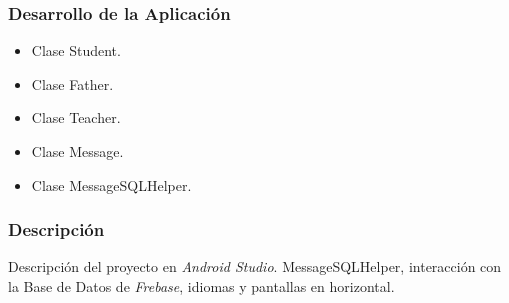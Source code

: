 \begin{frame}
	\frametitle{Desarrollo de la Aplicación}
		\begin{itemize}
			\item Clase {\ttfamily Student}.
			\item Clase {\ttfamily Father}.
			\item Clase {\ttfamily Teacher}.
			\item Clase {\ttfamily Message}.
			\item Clase {\ttfamily MessageSQLHelper}.
		\end{itemize}
	\endblock{}
\end{frame}


\begin{frame}
	\frametitle{Descripción}
	\block{}
		Descripción del proyecto en {\it Android Studio}.
		{\ttfamily MessageSQLHelper}, interacción con la Base de Datos de {\it Frebase}, idiomas y pantallas en horizontal.
	\endblock{}
\end{frame}


\begin{frame}
	
\end{frame}